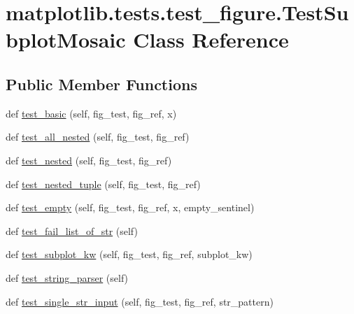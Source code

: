 \hypertarget{classmatplotlib_1_1tests_1_1test__figure_1_1TestSubplotMosaic}{}\section{matplotlib.\+tests.\+test\+\_\+figure.\+Test\+Subplot\+Mosaic Class Reference}
\label{classmatplotlib_1_1tests_1_1test__figure_1_1TestSubplotMosaic}
\subsection*{Public Member Functions}
\begin{DoxyCompactItemize}
\item 
def \hyperlink{classmatplotlib_1_1tests_1_1test__figure_1_1TestSubplotMosaic_abcfab44eece1b19997f03dd9ae51e4a6}{test\+\_\+basic} (self, fig\+\_\+test, fig\+\_\+ref, x)
\item 
def \hyperlink{classmatplotlib_1_1tests_1_1test__figure_1_1TestSubplotMosaic_afc004c8a44b6e10c0e8f2554f64e852b}{test\+\_\+all\+\_\+nested} (self, fig\+\_\+test, fig\+\_\+ref)
\item 
def \hyperlink{classmatplotlib_1_1tests_1_1test__figure_1_1TestSubplotMosaic_a797e14c2b54aae94e8fd3d8496d8dbb1}{test\+\_\+nested} (self, fig\+\_\+test, fig\+\_\+ref)
\item 
def \hyperlink{classmatplotlib_1_1tests_1_1test__figure_1_1TestSubplotMosaic_a2ec92099c19d5a9d7bb6aa9f040788c5}{test\+\_\+nested\+\_\+tuple} (self, fig\+\_\+test, fig\+\_\+ref)
\item 
def \hyperlink{classmatplotlib_1_1tests_1_1test__figure_1_1TestSubplotMosaic_a01847dc0bd64726c74ca5d01939e5a1d}{test\+\_\+empty} (self, fig\+\_\+test, fig\+\_\+ref, x, empty\+\_\+sentinel)
\item 
def \hyperlink{classmatplotlib_1_1tests_1_1test__figure_1_1TestSubplotMosaic_a08979b06cbbb0138c974ee2b4d5c2f7d}{test\+\_\+fail\+\_\+list\+\_\+of\+\_\+str} (self)
\item 
def \hyperlink{classmatplotlib_1_1tests_1_1test__figure_1_1TestSubplotMosaic_a7bb761a330073e376d511196ee1fac58}{test\+\_\+subplot\+\_\+kw} (self, fig\+\_\+test, fig\+\_\+ref, subplot\+\_\+kw)
\item 
def \hyperlink{classmatplotlib_1_1tests_1_1test__figure_1_1TestSubplotMosaic_a465ae73f2340e02cd92c9eee260cc9a1}{test\+\_\+string\+\_\+parser} (self)
\item 
def \hyperlink{classmatplotlib_1_1tests_1_1test__figure_1_1TestSubplotMosaic_aca6e4c0e36b07794f2b220360951edf2}{test\+\_\+single\+\_\+str\+\_\+input} (self, fig\+\_\+test, fig\+\_\+ref, str\+\_\+pattern)

\end{DoxyCompactItemize}
